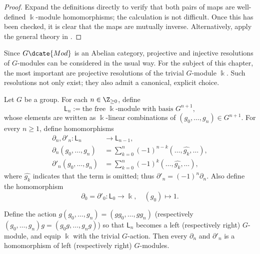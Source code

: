 \begin{proof}
	Expand the definitions directly to verify that both pairs of maps are
	well-defined $\Bbbk$-module homomorphisms; the calculation is not
	difficult. Once this has been checked, it is clear that the maps are
	mutually inverse. Alternatively, apply the general theory in
	\cite[Corollary 6.6.8]{Li1}.
\end{proof}

Since $G\dcate{Mod}$ is an Abelian category, projective and injective
resolutions of $G$-modules can be considered in the usual way. For the subject
of this chapter, the most important are projective resolutions of the trivial
$G$-module $\Bbbk$. Such resolutions not only exist; they also admit a
canonical, explicit choice.

\begin{definition}\label{def:resolution-trivial-module}
	Let $G$ be a group. For each $n\in\Z_{\geq0}$, define
	\[ \mathsf{L}_n := \text{the free $\Bbbk$-module with basis $G^{n+1}$}, \]
	whose elements are written as $\Bbbk$-linear combinations of
	$(g_0,\ldots,g_n)\in G^{n+1}$. For every $n\geq1$, define homomorphisms
	\begin{align*}
		\partial_n, \partial'_n: \mathsf{L}_n & \to \mathsf{L}_{n-1}, \\
		\partial_n\left( g_0, \ldots, g_n \right) & = \sum_{k=0}^n (-1)^{n-k} (\ldots, \widehat{g_k}, \ldots), \\
		\partial'_n\left( g_0, \ldots, g_n \right) & = \sum_{k=0}^n (-1)^k (\ldots, \widehat{g_k}, \ldots),
	\end{align*}
	where $\widehat{g_k}$ indicates that the term is omitted; thus
	$\partial'_n=(-1)^n\partial_n$. Also define the homomorphism
	\[ \partial_0 = \partial'_0: \mathsf{L}_0 \to \Bbbk, \quad (g_0) \mapsto 1. \]

	Define the action
	$g(g_0,\ldots,g_n)=(gg_0,\ldots,gg_n)$ (respectively
	$(g_0,\ldots,g_n)g=(g_0g,\ldots,g_ng)$) so that $\mathsf{L}_n$ becomes a
	left (respectively right) $G$-module, and equip $\Bbbk$ with the trivial
	$G$-action. Then every $\partial_n$ and $\partial'_n$ is a homomorphism of
	left (respectively right) $G$-modules.
\end{definition}

